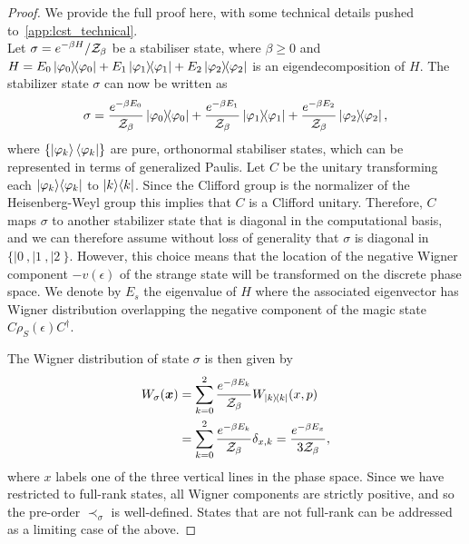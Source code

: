 \documentclass[pra,
aps,
twocolumn,
superscriptaddress,
groupedaddress,
nofootinbib,
reprint
]{revtex4-1}
\begin{document}
\begin{proof}
	We provide the full proof here, with some technical details pushed to~\cref{app:lcst_technical}.\\

Let $\displaystyle \sigma = e^{-\beta H} / \mathcal{Z}_\beta$ be a stabiliser state, where $\beta \geq 0$ and $H = E_0 \ketbra{\varphi_0} + E_1 \ketbra{\varphi_1} + E_2 \ketbra{\varphi_2}$ is an eigendecomposition of $H$.
The stabilizer state $\sigma$ can now be written as 
\begin{equation}
	\sigma = \frac{e^{-\beta E_0}}{\mathcal{Z}_\beta} \ketbra{\varphi_0} + \frac{e^{-\beta E_1}}{\mathcal{Z}_\beta} \ketbra{\varphi_1} + \frac{e^{-\beta E_2}}{\mathcal{Z}_\beta} \ketbra{\varphi_2},
\end{equation}
where $\{\ket{\varphi_k}\langle\varphi_k|\}$ are pure, orthonormal stabiliser states, which can be represented in terms of generalized Paulis. Let $C$ be the unitary transforming each $|\varphi_k\rangle\langle\varphi_k|$ to $|k\rangle\langle k|$. Since the Clifford group is the normalizer of the Heisenberg-Weyl group this implies that $C$ is a Clifford unitary. Therefore, $C$ maps $\sigma$ to another stabilizer state that is diagonal in the computational basis, and we can therefore assume without loss of generality that $\sigma$ is diagonal in $\{|0\>,|1\>, |2\>\}$. However, this choice means that the location of the negative Wigner component $-v(\epsilon)$ of the strange state will be transformed on the discrete phase space. We denote by $E_s$ the eigenvalue of $H$ where the associated eigenvector has Wigner distribution overlapping the negative component of the magic state $C\rho_S(\epsilon)C^\dagger$.  

The Wigner distribution of state $\sigma$ is then given by
\begin{align}
	\W[\bmx]{\sigma} &= \sum\limits_{k=0}^2 \frac{e^{-\beta E_k}}{\Z_\beta}W_{\ketbra{k}}(x, p) \nonumber\\
	&= \sum\limits_{k=0}^2 \frac{e^{-\beta E_k}}{\Z_\beta} \delta_{x, k} = \frac{e^{-\beta E_{x}}}{3\Z_\beta},
\end{align}
where $x$ labels one of the three vertical lines in the phase space.
Since we have restricted to full-rank states, all Wigner components are strictly positive, and so the pre-order $\prec_{\sigma}$ is well-defined. States that are not full-rank can be addressed as a limiting case of the above.


\end{proof}
\end{document}
